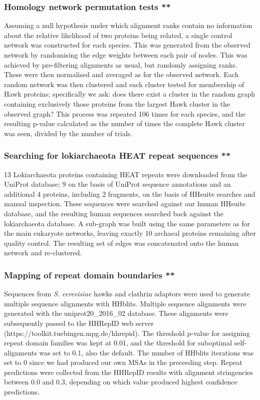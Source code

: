\documentclass[a4paper,11pt,twoside,openright]{scrbook}
\begin{document}
\subsubsection{Homology network permutation tests **}
Assuming a null hypothesis under which alignment ranks contain no information about the relative likelihood of two proteins being related, a single control network was constructed for each species. This was generated from the observed network by randomising the edge weights between each pair of nodes. This was achieved by pre-filtering alignments as usual, but randomly assigning ranks. These were then normalised and averaged as for the observed network. Each random network was then clustered and each cluster tested for membership of Hawk proteins; specifically we ask: does there exist a cluster in the random graph containing exclusively those proteins from the largest Hawk cluster in the observed graph? This process was repeated 106 times for each species, and the resulting p-value calculated as the number of times the complete Hawk cluster was seen, divided by the number of trials.

\subsubsection{Searching for lokiarchaeota HEAT repeat sequences **}
13 Lokiarchaeota proteins containing HEAT repeats were downloaded from the UniProt database; 9 on the basis of UniProt sequence annotations and an additional 4 proteins, including 2 fragments, on the basis of HHsuite searches and manual inspection. These sequences were searched against our human HHsuite database, and the resulting human sequences searched back against the lokiarchaeota database. A sub-graph was built using the same parameters as for the main eukaryote networks, leaving exactly 10 archaeal proteins remaining after quality control. The resulting set of edges was concatenated onto the human network and re-clustered.

\subsubsection{Mapping of repeat domain boundaries **}
Sequences from \textit{S. cerevisiae} hawks and clathrin adaptors were used to generate multiple sequence alignments with HHblits. Multiple sequence alignments were generated with the uniprot20\_2016\_02 database. These alignments were subsequently passed to the HHRepID web server \newline (https://toolkit.tuebingen.mpg.de/hhrepid). The threshold p-value for assigning repeat domain families was kept at 0.01, and the threshold for suboptimal self-alignments was set to 0.1, also the default. The number of HHblits iterations was set to 0 since we had produced our own MSAs in the preceeding step. Repeat predictions were collected from the HHRepID results with alignment stringencies between 0.0 and 0.3, depending on which value produced highest confidence predictions.
\end{document}
